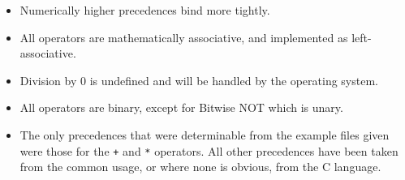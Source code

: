 \documentclass[a4wide, 11pt]{article}
\begin{document}
\begin{itemize}
\item Numerically higher precedences bind more tightly.

\item All operators are mathematically associative, and implemented as
left-associative.

\item Division by 0 is undefined and will be handled by the operating system.

\item All operators are binary, except for Bitwise NOT which is unary.

\item The only precedences that were determinable from the example files given
were those for the \verb|+| and \verb|*| operators. All other precedences have
been taken from the common usage, or where none is obvious, from the C language.
\end{itemize}
\end{document}
